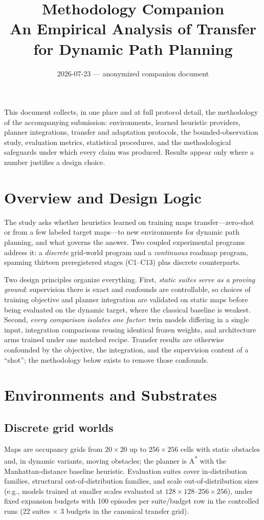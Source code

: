 \documentclass[11pt,letterpaper]{article}
\title{Methodology Companion\\[0.3em]\large An Empirical Analysis of Transfer for Dynamic Path Planning}
\author{}
\date{2026-07-23 --- anonymized companion document}
\newcommand{\stage}[1]{\textsc{#1}}
\begin{document}
\maketitle

\noindent This document collects, in one place and at full protocol detail, the methodology of the accompanying submission: environments, learned heuristic providers, planner integrations, transfer and adaptation protocols, the bounded-observation study, evaluation metrics, statistical procedures, and the methodological safeguards under which every claim was produced. Results appear only where a number justifies a design choice.

\section{Overview and Design Logic}

The study asks whether heuristics learned on training maps transfer---zero-shot or from a few labeled target maps---to new environments for dynamic path planning, and what governs the answer. Two coupled experimental programs address it: a \emph{discrete} grid-world program and a \emph{continuous} roadmap program, spanning thirteen preregistered stages (\stage{C1}--\stage{C13}) plus discrete counterparts.

Two design principles organize everything. First, \emph{static suites serve as a proving ground}: supervision there is exact and confounds are controllable, so choices of training objective and planner integration are validated on static maps before being evaluated on the dynamic target, where the classical baseline is weakest. Second, \emph{every comparison isolates one factor}: twin models differing in a single input, integration comparisons reusing identical frozen weights, and architecture arms trained under one matched recipe. Transfer results are otherwise confounded by the objective, the integration, and the supervision content of a ``shot''; the methodology below exists to remove those confounds.

\section{Environments and Substrates}

\subsection{Discrete grid worlds}
Maps are occupancy grids from $20{\times}20$ up to $256{\times}256$ cells with static obstacles and, in dynamic variants, moving obstacles; the planner is A\textsuperscript{*} \citep{hart1968astar} with the Manhattan-distance baseline heuristic. Evaluation suites cover in-distribution families, structural out-of-distribution families, and scale out-of-distribution sizes (e.g., models trained at smaller scales evaluated at $128{\times}128$--$256{\times}256$), under fixed expansion budgets with 100 episodes per suite/budget row in the controlled runs (22 suites $\times$ 3 budgets in the canonical transfer grid).
\end{document}
